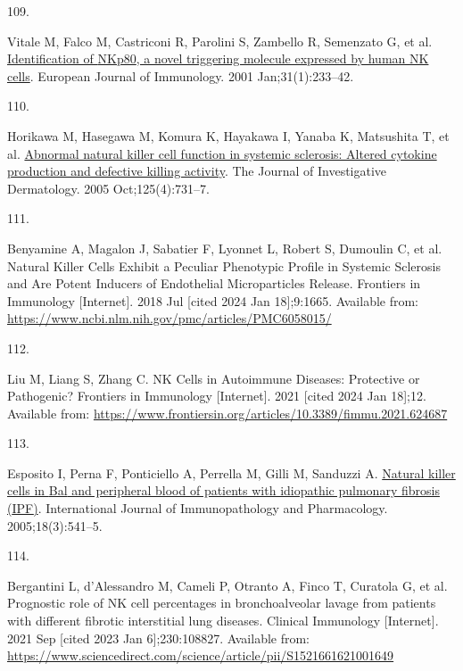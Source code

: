 \documentclass[
]{article}
\newlength{\cslhangindent}
\newlength{\csllabelwidth}
\newenvironment{CSLReferences}[2] %
 {\begin{list}{}{%
  \setlength{\itemindent}{0pt}
  \setlength{\leftmargin}{0pt}
  \setlength{\parsep}{0pt}
  \ifodd #1
   \setlength{\leftmargin}{\cslhangindent}
   \setlength{\itemindent}{-1\cslhangindent}
  \fi
  \setlength{\itemsep}{#2\baselineskip}}}
 {\end{list}}
\newcommand{\CSLLeftMargin}[1]{\parbox[t]{\csllabelwidth}{\strut#1\strut}}
\newcommand{\CSLRightInline}[1]{\parbox[t]{\linewidth - \csllabelwidth}{\strut#1\strut}}
\begin{document}
\begin{CSLReferences}{0}{1}
\CSLLeftMargin{109. }%
\CSLRightInline{Vitale M, Falco M, Castriconi R, Parolini S, Zambello R, Semenzato G, et al. \href{https://doi.org/10.1002/1521-4141(200101)31:1\%3C233::AID-IMMU233\%3E3.0.CO;2-4}{Identification of {NKp80}, a novel triggering molecule expressed by human {NK} cells}. European Journal of Immunology. 2001 Jan;31(1):233--42. }

\CSLLeftMargin{110. }%
\CSLRightInline{Horikawa M, Hasegawa M, Komura K, Hayakawa I, Yanaba K, Matsushita T, et al. \href{https://doi.org/10.1111/j.0022-202X.2005.23767.x}{Abnormal natural killer cell function in systemic sclerosis: Altered cytokine production and defective killing activity}. The Journal of Investigative Dermatology. 2005 Oct;125(4):731--7. }

\CSLLeftMargin{111. }%
\CSLRightInline{Benyamine A, Magalon J, Sabatier F, Lyonnet L, Robert S, Dumoulin C, et al. Natural {Killer} {Cells} {Exhibit} a {Peculiar} {Phenotypic} {Profile} in {Systemic} {Sclerosis} and {Are} {Potent} {Inducers} of {Endothelial} {Microparticles} {Release}. Frontiers in Immunology {[}Internet{]}. 2018 Jul {[}cited 2024 Jan 18{]};9:1665. Available from: \url{https://www.ncbi.nlm.nih.gov/pmc/articles/PMC6058015/}}

\CSLLeftMargin{112. }%
\CSLRightInline{Liu M, Liang S, Zhang C. {NK} {Cells} in {Autoimmune} {Diseases}: {Protective} or {Pathogenic}? Frontiers in Immunology {[}Internet{]}. 2021 {[}cited 2024 Jan 18{]};12. Available from: \url{https://www.frontiersin.org/articles/10.3389/fimmu.2021.624687}}

\CSLLeftMargin{113. }%
\CSLRightInline{Esposito I, Perna F, Ponticiello A, Perrella M, Gilli M, Sanduzzi A. \href{https://doi.org/10.1177/039463200501800314}{Natural killer cells in {Bal} and peripheral blood of patients with idiopathic pulmonary fibrosis ({IPF})}. International Journal of Immunopathology and Pharmacology. 2005;18(3):541--5. }

\CSLLeftMargin{114. }%
\CSLRightInline{Bergantini L, d'Alessandro M, Cameli P, Otranto A, Finco T, Curatola G, et al. Prognostic role of {NK} cell percentages in bronchoalveolar lavage from patients with different fibrotic interstitial lung diseases. Clinical Immunology {[}Internet{]}. 2021 Sep {[}cited 2023 Jan 6{]};230:108827. Available from: \url{https://www.sciencedirect.com/science/article/pii/S1521661621001649}}


\end{CSLReferences}
\end{document}
